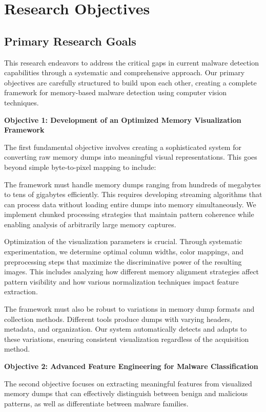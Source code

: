 \section{Research Objectives}
\label{sec:objectives}

\subsection{Primary Research Goals}
\label{subsec:primary_goals}

This research endeavors to address the critical gaps in current malware detection capabilities through a systematic and comprehensive approach. Our primary objectives are carefully structured to build upon each other, creating a complete framework for memory-based malware detection using computer vision techniques.

\textbf{Objective 1: Development of an Optimized Memory Visualization Framework}

The first fundamental objective involves creating a sophisticated system for converting raw memory dumps into meaningful visual representations. This goes beyond simple byte-to-pixel mapping to include:

The framework must handle memory dumps ranging from hundreds of megabytes to tens of gigabytes efficiently. This requires developing streaming algorithms that can process data without loading entire dumps into memory simultaneously. We implement chunked processing strategies that maintain pattern coherence while enabling analysis of arbitrarily large memory captures.

Optimization of the visualization parameters is crucial. Through systematic experimentation, we determine optimal column widths, color mappings, and preprocessing steps that maximize the discriminative power of the resulting images. This includes analyzing how different memory alignment strategies affect pattern visibility and how various normalization techniques impact feature extraction.

The framework must also be robust to variations in memory dump formats and collection methods. Different tools produce dumps with varying headers, metadata, and organization. Our system automatically detects and adapts to these variations, ensuring consistent visualization regardless of the acquisition method.

\textbf{Objective 2: Advanced Feature Engineering for Malware Classification}

The second objective focuses on extracting meaningful features from visualized memory dumps that can effectively distinguish between benign and malicious patterns, as well as differentiate between malware families.

